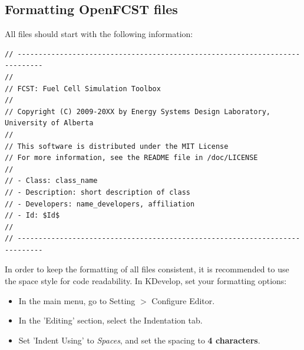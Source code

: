 \subsection{Formatting OpenFCST files}

All files should start with the following information:

\begin{lstlisting}
// ----------------------------------------------------------------------------
//
// FCST: Fuel Cell Simulation Toolbox
//
// Copyright (C) 2009-20XX by Energy Systems Design Laboratory, University of Alberta
//
// This software is distributed under the MIT License
// For more information, see the README file in /doc/LICENSE
//
// - Class: class_name
// - Description: short description of class
// - Developers: name_developers, affiliation
// - Id: $Id$
//
// ----------------------------------------------------------------------------
\end{lstlisting}
 
In order to keep the formatting of all files consistent, it is recommended to use the space style for code readability. In KDevelop, set your formatting options:
\begin{itemize}
\item In the main menu, go to Setting $>$ Configure Editor.
\item In the 'Editing' section, select the Indentation tab.
\item Set 'Indent Using' to \textit{Spaces}, and set the spacing to \textbf{4 characters}. 
\end{itemize}
